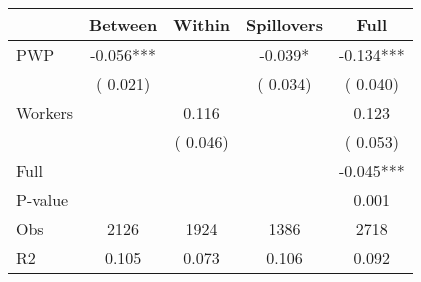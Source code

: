 
\begin{tabular}{l*{4}{c}}\hline&\multicolumn{1}{c}{Between}&\multicolumn{1}{c}{Within}&\multicolumn{1}{c}{Spillovers}&\multicolumn{1}{c}{Full}\\ \hline
 PWP           &             -0.056***      &                                               &       -0.039* &        -0.134***                            \\ 
                               &        (       0.021)           &                                       &       (       0.034)     &      (       0.040)                                           \\ 
 Workers       &                                               &        0.116    &                                &             0.123                            \\ 
                               &                                               & (       0.046)                  &                                        &      (       0.053)                                           \\ 
\hline                                                                                                                                                                                                                                            
 Full                  &                                               &                                               &                                        &            -0.045***                                     \\ 
 P-value               &                                               &                                               &                                        &             0.001                                           \\ 
 Obs                   &               2126               &       1924                       &       1386                &              2718                                               \\ 
 R2                    &                      0.105              &              0.073                      &              0.106               &                     0.092                                              \\ 
\hline \end{tabular}                                                                                                                                                                                                              